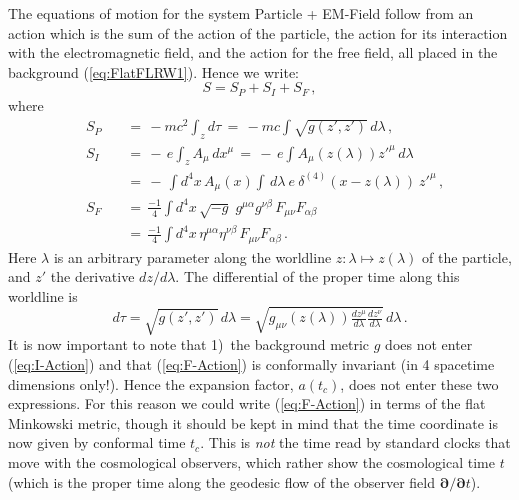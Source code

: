 \documentclass
[rmp,aps,twocolumn,showpacs,preprintnumbers,amsmath,amssymb]{revtex4}
\theoremstyle{plain}
\theoremstyle{definition}
\theoremstyle{remark}
\newcommand{\bpartial}{\boldsymbol{\partial}} %
\begin{document}
The equations of motion for the system Particle + EM-Field
follow from an action which is the sum of the action of the 
particle, the action for its interaction with the electromagnetic 
field, and the action for the free field, all placed in the 
background (\ref{eq:FlatFLRW1}). Hence we write:  
%
\begin{equation}\label{eq:ActionSum}
  S=S_P+S_I+S_F\,,
\end{equation} 
%
where
%
\begin{subequations}
\begin{alignat}{2}
\label{eq:P-Action}
&S_P &&\,=\,-mc^2\int_z d\tau
       \,=\,-mc\int\sqrt{g(z',z')}\,d\lambda\,,\\
&S_I &&\,=\,-\,e\int_zA_\mu\,dx^\mu
       \,=\,-\,e\int A_\mu(z(\lambda))z'^\mu\,d\lambda\nonumber\\
\label{eq:I-Action}
&    &&\,=\,-\,\int d^4x\,A_\mu(x)\int\,d\lambda\ e\ 
            \delta^{(4)}(x-z(\lambda))\ z'^\mu\,,\\
&S_F &&\,=\,\frac{-1}{4}\int d^4x\,\sqrt{- g}\;
          g^{\mu\alpha}g^{\nu\beta}\,F_{\mu\nu}F_{\alpha\beta}\nonumber\\
\label{eq:F-Action}
& &&\,=\,\frac{-1}{4}\int d^4x\,\eta^{\mu\alpha}
       \eta^{\nu\beta}\,F_{\mu\nu}F_{\alpha\beta}\,.
\end{alignat}
\end{subequations}
%
Here $\lambda$ is an arbitrary parameter along the worldline 
$z:\lambda\mapsto z(\lambda)$ of the particle, and $z'$
the derivative $dz/d\lambda$. The differential of the 
proper time along this worldline is 
%
\begin{equation}\label{eq:DefEigentime}
  d\tau=\sqrt{g(z',z')}\,d\lambda
       =\sqrt{g_{\mu\nu}(z(\lambda))\tfrac{dz^\mu}{d\lambda}
        \tfrac{dz^\nu}{d\lambda}}\,d\lambda\,.
\end{equation}
%
It is now important to note that 1)~the background metric $g$
does not enter (\ref{eq:I-Action}) and that (\ref{eq:F-Action})
is conformally invariant (in 4 spacetime dimensions only!). Hence 
the expansion factor, $a(t_c)$, does not enter these two 
expressions. For this reason we could write (\ref{eq:F-Action})
in terms of the flat Minkowski metric, though it should be kept 
in mind that the time coordinate is now given by conformal time
$t_c$. This is \emph{not} the time read by standard clocks that 
move with the cosmological observers, which rather show the 
cosmological time $t$ (which is the proper time along the 
geodesic flow of the observer field $\bpartial/\bpartial t$). 
\end{document}
